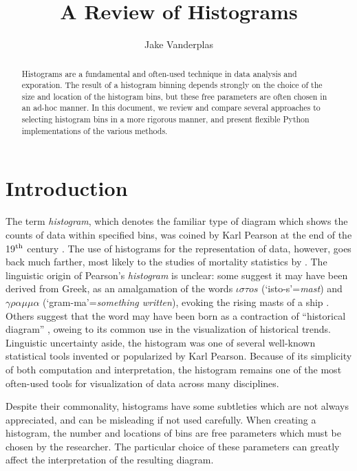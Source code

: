 \documentclass[12pt]{article}
\title{A Review of Histograms}
\author{Jake Vanderplas}
\begin{document}
\maketitle

\begin{abstract}
  Histograms are a fundamental and often-used technique in data analysis and
  exporation.  The result of a histogram binning depends strongly on the
  choice of the size and location of the histogram bins, but these free
  parameters are often chosen in an ad-hoc manner.  In this document, we
  review and compare several approaches to selecting histogram bins in a
  more rigorous manner, and present flexible Python implementations of
  the various methods.
\end{abstract}

\section{Introduction}
\label{sec:intro}

The term {\it histogram}, which denotes the familiar type of diagram
which shows the counts of data within specified bins, was coined by
Karl Pearson at the end of the 19$^{\rm th}$ century \citep{Stigler1986}.
The use of histograms for the representation of data, however, goes back
much farther, most likely to the studies of mortality statistics
by \citet{Graunt1662} \citep[though see discussion in][]{Scott1992}.
The linguistic origin of Pearson's {\it histogram} is unclear: some suggest
it may have been derived from Greek, as an amalgamation of the words
$\iota\sigma\tau o s$ (`isto-s'={\it mast}) and
$\gamma\rho\alpha\mu\mu\alpha$ (`gram-ma'={\it something written}), evoking
the rising masts of a ship \citep[e.g.][]{Ioannidis2003}.  Others suggest
that the word may have been born as a contraction of ``historical diagram''
\citep[e.g.][]{Flood2011}, oweing to its common use in the visualization of
historical trends.  Linguistic uncertainty aside,
the histogram was one of several well-known
statistical tools invented or popularized by Karl Pearson.
Because of its simplicity of both computation and interpretation, the
histogram remains one of the most often-used tools for visualization
of data across many disciplines.

Despite their commonality, histograms have some subtleties which are
not always appreciated, and can be misleading if not used carefully.
When creating a histogram, the number and locations of bins are
free parameters which must be chosen by the researcher.
The particular choice of these parameters can greatly
affect the interpretation of the resulting diagram.
\end{document}
